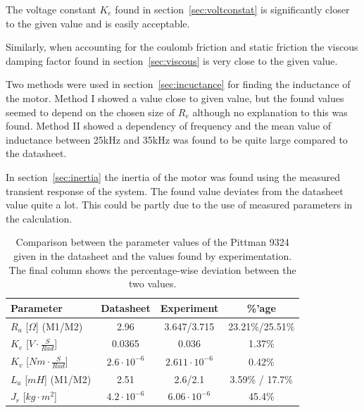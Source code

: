 \par
The voltage constant $K_e$ found in section~\ref{sec:voltconstat} is significantly closer to the given value and is easily acceptable.

\par
Similarly, when accounting for the coulomb friction and static friction the viscous damping factor found in section~\ref{sec:viscous} is very close to the given value.

\par
Two methods were used in section~\ref{sec:incuctance} for finding the inductance of the motor.
Method I showed a value close to given value, but the found values seemed to depend on the chosen size of $R_e$ although no explanation to this was found. 
Method II showed a dependency of frequency and the mean value of inductance between 25kHz and 35kHz was found to be quite large compared to the datasheet.

\par
In section~\ref{sec:inertia} the inertia of the motor was found using the measured transient response of the system.
The found value deviates from the datasheet value quite a lot. 
This could be partly due to the use of measured parameters in the calculation.

\begin{table}
	\centering
	\begin{tabular}{|l|c|c|c|}
		\hline
		Parameter & Datasheet & Experiment & \%'age\\
		\hline
		$R_a$ [$\Omega$] (M1/M2) & 2.96 & 3.647/3.715 & 23.21\%/25.51\%\\
		$K_e$ [$V\cdot\frac{S}{Rad}$]& 0.0365 & 0.036 & 1.37\%\\
		$K_v$ [$Nm\cdot\frac{S}{Rad}$]& $2.6\cdot10^{-6}$ & $2.611\cdot10^{-6}$ & 0.42\%\\
		$L_a$ [$mH$] (M1/M2)& 2.51 & 2.6/2.1 & 3.59\% / 17.7\%\\
		$J_r$ [$kg\cdot m^2$]& $4.2\cdot10^{-6}$& $6.06 \cdot10^{-6}$ & 45.4\%\\
		\hline
	\end{tabular}
	\caption[Comparison of parameter values.]{Comparison between the parameter values of the Pittman 9324 given in the datasheet and the values found by experimentation. The final column shows the percentage-wise deviation between the two values.}
	\label{tab:compare}
\end{table}

